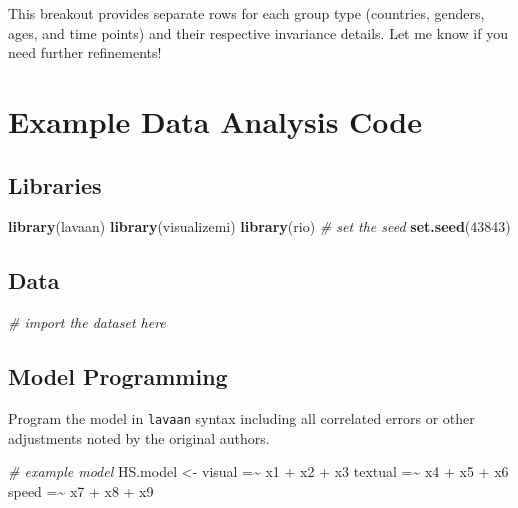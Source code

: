 \documentclass[
  english,
  man]{apa7}
\newenvironment{Shaded}{\begin{snugshade}}{\end{snugshade}}
\newcommand{\CommentTok}[1]{\textcolor[rgb]{0.56,0.35,0.01}{\textit{#1}}}
\newcommand{\DecValTok}[1]{\textcolor[rgb]{0.00,0.00,0.81}{#1}}
\newcommand{\FunctionTok}[1]{\textcolor[rgb]{0.13,0.29,0.53}{\textbf{#1}}}
\newcommand{\NormalTok}[1]{#1}
\newcommand{\OtherTok}[1]{\textcolor[rgb]{0.56,0.35,0.01}{#1}}
\newcommand{\StringTok}[1]{\textcolor[rgb]{0.31,0.60,0.02}{#1}}
\begin{document}
This breakout provides separate rows for each group type (countries, genders, ages, and time points) and their respective invariance details. Let me know if you need further refinements!

\section{Example Data Analysis Code}\label{example-data-analysis-code}

\subsection{Libraries}\label{libraries}

\begin{Shaded}
\begin{Highlighting}[]
\FunctionTok{library}\NormalTok{(lavaan)}
\FunctionTok{library}\NormalTok{(visualizemi)}
\FunctionTok{library}\NormalTok{(rio)}
\CommentTok{\# set the seed}
\FunctionTok{set.seed}\NormalTok{(}\DecValTok{43843}\NormalTok{)}
\end{Highlighting}
\end{Shaded}

\subsection{Data}\label{data-1}

\begin{Shaded}
\begin{Highlighting}[]
\CommentTok{\# import the dataset here }
\end{Highlighting}
\end{Shaded}

\subsection{Model Programming}\label{model-programming}

Program the model in \texttt{lavaan} syntax including all correlated errors or other adjustments noted by the original authors.

\begin{Shaded}
\begin{Highlighting}[]
\CommentTok{\# example model }
\NormalTok{HS.model }\OtherTok{\textless{}{-}} \StringTok{\textquotesingle{} visual  =\textasciitilde{} x1 + x2 + x3}
\StringTok{              textual =\textasciitilde{} x4 + x5 + x6}
\StringTok{              speed   =\textasciitilde{} x7 + x8 + x9 \textquotesingle{}}
\end{Highlighting}
\end{Shaded}
\end{document}
